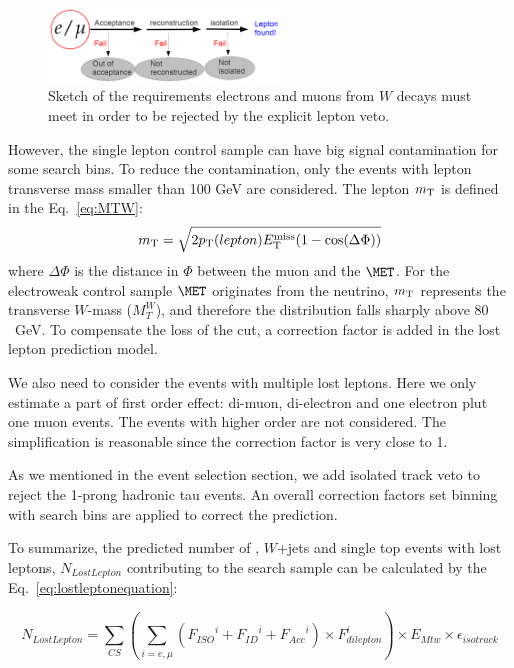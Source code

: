 \begin{figure}[htbp]
\begin{center}
\includegraphics[width=0.55\textwidth]{sections/mc4/Backgrounds/LostLepton/figures/lepton_veto_sketch.png}
\end{center}
\caption{Sketch of the requirements electrons and muons from $W$ decays must meet in order to be rejected by the explicit lepton veto.}
\label{fig:llmethod}
\end{figure}

However, the single lepton control sample can have big signal contamination for some search bins. To reduce the contamination, only the events with lepton transverse mass smaller than 100 GeV are considered. The lepton $m_{\rm T}$ is defined in the Eq.~\ref{eq:MTW}:
\begin{equation}
m_{\rm T} = \sqrt{2 p_{\rm T}(lepton) E^{\rm miss}_{\rm T} (1 - \cos(\Delta \Phi))}
\label{eq:MTW}
\end{equation}
where $\Delta \Phi$ is the distance in $\Phi$ between the muon and the $\MET$. For the electroweak control sample $\MET$ originates from the neutrino, $m_{\rm T}$ represents the transverse $W$-mass ($M_{T}^{W}$), and therefore the distribution falls sharply above $80$~GeV. To compensate the loss of the cut, a correction factor is added in the lost lepton prediction model. 

We also need to consider the events with multiple lost leptons. Here we only estimate a part of first order effect: di-muon, di-electron and one electron plut one muon events. The events with higher order are not considered. The simplification is reasonable since the correction factor is very close to 1.

As we mentioned in the event selection section, we add isolated track veto to reject the 1-prong hadronic tau events. An overall correction factors set binning with search bins are applied to correct the prediction. 

To summarize, the predicted number of \ttbar, $W$+jets and single top events with lost leptons, $N_{LostLepton}$ contributing to the search sample can be calculated by the Eq.~\ref{eq:lostleptonequation}:

\begin{equation}
N_{LostLepton}= \sum_{CS} (\sum_{i={e,\mu}}({F_{ISO}}^{i}+{F_{ID}}^{i}+{F_{Acc}}^{i}) \times F_{dilepton}^{i}) \times E_{Mtw} \times \epsilon_{isotrack}
\label{eq:lostleptonequation}
\end{equation}

